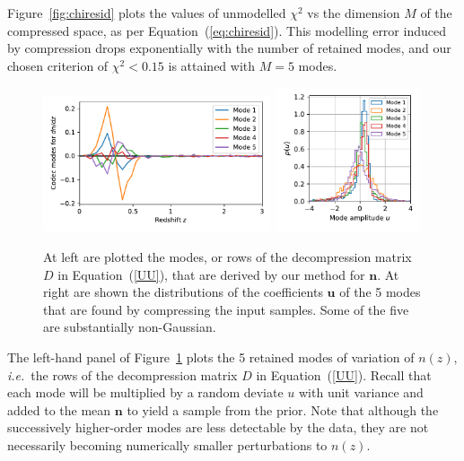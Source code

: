 \documentclass[linenumbers, onecolumn]{aastex63}
\newcommand{\ie}{\textit{i.e.}}
\newcommand{\eqq}[1]{Equation~(\ref{#1})}
\newcommand{\vecn}{\ensuremath{\mathbf{n}}}
\newcommand{\vecu}{\ensuremath{\mathbf{u}}}
\newcommand{\matD}{D}
\begin{document}
Figure~\ref{fig:chiresid} plots the values of unmodelled
$\chi^2$ vs the dimension $M$ of the compressed space, as per
\eqq{eq:chiresid}.  This modelling error induced by compression drops
exponentially with the number of retained modes, and our chosen criterion of
$\chi^2<0.15$ is attained with $M=5$ modes.

\begin{figure}
  \center
  \includegraphics[width=0.6\textwidth]{modes.pdf}
  \includegraphics[width=0.38\textwidth]{uhist.pdf}
\caption{At left are plotted the modes, or rows of the decompression
  matrix $\matD$ in \eqq{UU}, that are derived by our method for $\vecn.$
 At right are shown the distributions of the coefficients
  $\vecu$ of the 5 modes that are found by compressing the input
  samples.  Some of the five are substantially non-Gaussian.}
\label{fig:modes}
\end{figure}

The left-hand panel of Figure~\ref{fig:modes} plots the 5 retained
modes of variation of $n(z),$ \ie\ the rows of the decompression
matrix $\matD$ in \eqq{UU}.   Recall that each mode will be multiplied by
a random deviate $u$ with unit variance and added to the mean $\vecn$
to yield a sample from the prior.
 Note that although the successively higher-order modes 
are less detectable by the data, they are not necessarily becoming
numerically smaller perturbations to $n(z)$.
\end{document}
